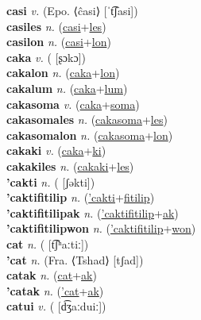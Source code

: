 \textbf{casi} \textit{v.} (Epo. ⟨ĉasi⟩ [ˈt͡ʃasi])
 \label{casi} \\
\textbf{casiles} \textit{n.} (\hyperref[casi]{casi}+\hyperref[les]{les})
 \label{casiles} \\
\textbf{casilon} \textit{n.} (\hyperref[casi]{casi}+\hyperref[lon]{lon})
 \label{casilon} \\
\textbf{caka} \textit{v.} ( [ʂɔkɔ])
 \label{caka} \\
\textbf{cakalon} \textit{n.} (\hyperref[caka]{caka}+\hyperref[lon]{lon})
 \label{cakalon} \\
\textbf{cakalum} \textit{n.} (\hyperref[caka]{caka}+\hyperref[lum]{lum})
 \label{cakalum} \\
\textbf{cakasoma} \textit{v.} (\hyperref[caka]{caka}+\hyperref[soma]{soma})
 \label{cakasoma} \\
\textbf{cakasomales} \textit{n.} (\hyperref[cakasoma]{cakasoma}+\hyperref[les]{les})
 \label{cakasomales} \\
\textbf{cakasomalon} \textit{n.} (\hyperref[cakasoma]{cakasoma}+\hyperref[lon]{lon})
 \label{cakasomalon} \\
\textbf{cakaki} \textit{v.} (\hyperref[caka]{caka}+\hyperref[ki]{ki})
 \label{cakaki} \\
\textbf{cakakiles} \textit{n.} (\hyperref[cakaki]{cakaki}+\hyperref[les]{les})
 \label{cakakiles} \\
\textbf{'cakti} \textit{n.} ( [ʃəkti])
 \label{'cakti} \\
\textbf{'caktifitilip} \textit{n.} (\hyperref['cakti]{'cakti}+\hyperref[fitilip]{fitilip})
 \label{'caktifitilip} \\
\textbf{'caktifitilipak} \textit{n.} (\hyperref['caktifitilip]{'caktifitilip}+\hyperref[ak]{ak})
 \label{'caktifitilipak} \\
\textbf{'caktifitilipwon} \textit{n.} (\hyperref['caktifitilip]{'caktifitilip}+\hyperref[won]{won})
 \label{'caktifitilipwon} \\
\textbf{cat} \textit{n.} ( [t͡ʃʰaːtiː])
 \label{cat} \\
\textbf{'cat} \textit{n.} (Fra. ⟨Tshad⟩ [tʃad])
 \label{'cat} \\
\textbf{catak} \textit{n.} (\hyperref[cat]{cat}+\hyperref[ak]{ak})
 \label{catak} \\
\textbf{'catak} \textit{n.} (\hyperref['cat]{'cat}+\hyperref[ak]{ak})
 \label{'catak} \\
\textbf{catui} \textit{v.} ( [d͡ʒaːduiː])
 \label{catui} \\

